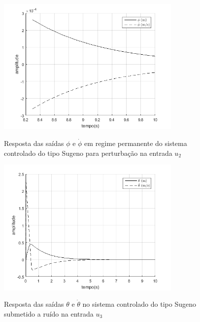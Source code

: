 \begin{figure}[!htb]
    \centering
    \caption{Resposta das saídas $\phi$ e $\dot{\phi}$ em regime permanente do sistema controlado do tipo Sugeno para perturbação na entrada $u_2$}
    \includegraphics[width=0.8\textwidth]{./04-figuras/resultados/fis_u2/u2_sugeno_u2_phi_regime_permanente}
    \label{fig:u2_sugeno_u2_phi_regime_permanente}
\end{figure}

\begin{figure}[!htb]
    \centering
    \caption{Resposta das saídas $\theta$ e $\dot{\theta}$ no sistema controlado do tipo Sugeno submetido a ruído na entrada $u_3$}
    \includegraphics[width=0.8\textwidth]{./04-figuras/resultados/fis_u3/u3_sugeno_u3_theta}
    \label{fig:u3_sugeno_u3_theta}
\end{figure}

